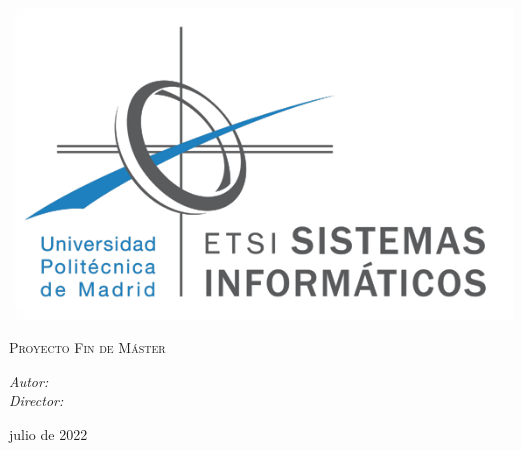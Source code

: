 \thispagestyle{empty}
\begin{flushleft}
  \includegraphics[width=.4\linewidth]{images/etsisi.png}
\end{flushleft}
\begin{center}
  \vspace*{1cm}

  \Huge
  \Course

  \vspace{2cm}
  \huge
  \Subtitle

  \vspace{2cm}

  \LARGE
  \textsc{Proyecto Fin de Máster}

  \vfill

  \Large
  \begin{flushright}
    \textit{Autor: \Authors} \\
    \textit{Director: \Docent} \\
  \end{flushright}

  \vspace{0.5cm}

  julio de 2022
\end{center}
\newpage
